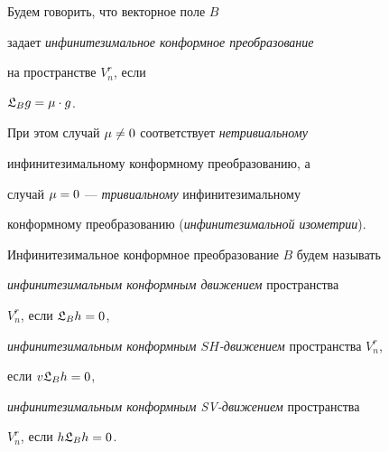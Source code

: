 \addtocounter{defn}{2}





\begin{defn}


Будем говорить, что векторное поле $B$


задает {\it инфинитезимальное конформное преобразование}


на пространстве $V^r_n$, если


$\frak {L}_{B}g=\mu\cdot g$.


При этом случай $\mu\ne 0$ соответствует {\it нетривиальному}


инфинитезимальному конформному преобразованию, а


случай $\mu=0$ --- {\it тривиальному} инфинитезимальному


конформному преобразованию ({\it инфинитезимальной изометрии}).





Инфинитезимальное конформное преобразование $B$ будем называть





{\it инфинитезимальным конформным движением} пространства


$V^r_n$, если $\frak {L}_{B}h=0$,





{\it инфинитезимальным конформным $SH$-движением} пространства $V^r_n$,


если $v \frak {L}_{B}h=0$,





{\it инфинитезимальным конформным SV-движением} пространства


$V^r_n$, если $h \frak {L}_{B}h=0$.


\end{defn}





